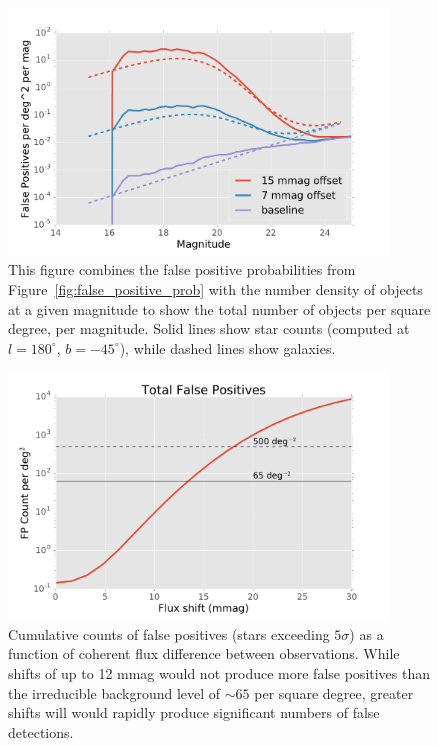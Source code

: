 \documentclass[12pt]{article}
\begin{document}
\begin{figure}
\includegraphics[width=0.9\textwidth]{figures/false_positive_differential.pdf}
\caption{This figure combines the false positive probabilities from
Figure~\ref{fig:false_positive_prob} with the number density of objects at a
given magnitude to show the total number of objects per square degree, per magnitude.
Solid lines show star counts (computed at $l=180^\circ$, $b=-45^\circ$), while
dashed lines show galaxies.
\label{fig:false_positive_differential}}
\end{figure}

\begin{figure}
\includegraphics[width=0.9\textwidth]{figures/fp_vs_flux_shift.pdf}
\caption{Cumulative counts of false positives (stars exceeding $5\sigma$) as a
function of coherent flux difference between observations. While shifts of up to
12 mmag would not produce more false positives than the irreducible background
level of $\sim 65$ per square degree, greater shifts will would rapidly produce
significant numbers of false detections. \label{fig:fp_vs_flux_shift}}
\end{figure}
\end{document}

